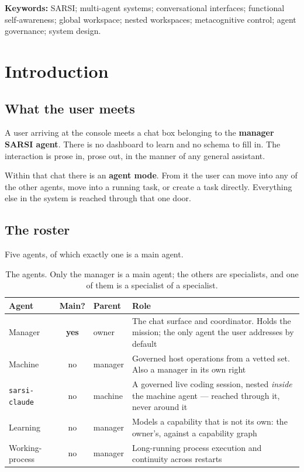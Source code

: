 \documentclass[11pt]{article}
\newcommand{\code}[1]{\texttt{\small #1}}
\begin{document}
\vspace{2pt}
\noindent\textbf{Keywords:} SARSI; multi-agent systems; conversational interfaces; functional self-awareness; global workspace; nested workspaces; metacognitive control; agent governance; system design.

\tableofcontents
\newpage

\section{Introduction}
\label{sec:intro}

\subsection{What the user meets}

A user arriving at the console meets a chat box belonging to the \textbf{manager SARSI agent}. There is no dashboard to learn and no schema to fill in. The interaction is prose in, prose out, in the manner of any general assistant.

Within that chat there is an \textbf{agent mode}. From it the user can move into any of the other agents, move into a running task, or create a task directly. Everything else in the system is reached through that one door.

\subsection{The roster}

Five agents, of which exactly one is a main agent.

\begin{table}[h]
\centering\small
\caption{The agents. Only the manager is a main agent; the others are specialists, and one of them is a specialist of a specialist.}
\label{tab:roster}
\begin{tabular}{@{}L{3.2cm}cL{3.0cm}L{5.4cm}@{}}
\toprule
\textbf{Agent} & \textbf{Main?} & \textbf{Parent} & \textbf{Role} \\
\midrule
Manager & \textbf{yes} & owner & The chat surface and coordinator. Holds the mission; the only agent the user addresses by default \\
Machine & no & manager & Governed host operations from a vetted set. Also a manager in its own right \\
\code{sarsi-claude} & no & machine & A governed live coding session, nested \emph{inside} the machine agent --- reached through it, never around it \\
Learning & no & manager & Models a capability that is not its own: the owner's, against a capability graph \\
Working-process & no & manager & Long-running process execution and continuity across restarts \\
\bottomrule
\end{tabular}
\end{table}
\end{document}
